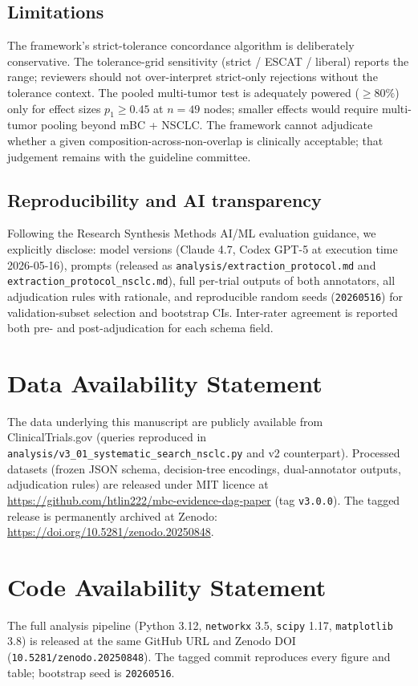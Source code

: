 \documentclass[11pt,a4paper]{article}
\begin{document}
\subsection{Limitations}
The framework's strict-tolerance concordance algorithm is deliberately conservative. The tolerance-grid sensitivity (strict / ESCAT / liberal) reports the range; reviewers should not over-interpret strict-only rejections without the tolerance context. The pooled multi-tumor test is adequately powered ($\ge 80\%$) only for effect sizes $p_1 \ge 0.45$ at $n = 49$ nodes; smaller effects would require multi-tumor pooling beyond mBC + NSCLC. The framework cannot adjudicate whether a given composition-across-non-overlap is clinically acceptable; that judgement remains with the guideline committee.

\subsection{Reproducibility and AI transparency}
Following the Research Synthesis Methods AI/ML evaluation guidance, we explicitly disclose: model versions (Claude 4.7, Codex GPT-5 at execution time 2026-05-16), prompts (released as \texttt{analysis/extraction\_protocol.md} and \texttt{extraction\_protocol\_nsclc.md}), full per-trial outputs of both annotators, all adjudication rules with rationale, and reproducible random seeds (\texttt{20260516}) for validation-subset selection and bootstrap CIs. Inter-rater agreement is reported both pre- and post-adjudication for each schema field.

\section*{Data Availability Statement}
The data underlying this manuscript are publicly available from ClinicalTrials.gov (queries reproduced in \texttt{analysis/v3\_01\_systematic\_search\_nsclc.py} and v2 counterpart). Processed datasets (frozen JSON schema, decision-tree encodings, dual-annotator outputs, adjudication rules) are released under MIT licence at \url{https://github.com/htlin222/mbc-evidence-dag-paper} (tag \texttt{v3.0.0}). The tagged release is permanently archived at Zenodo: \url{https://doi.org/10.5281/zenodo.20250848}.

\section*{Code Availability Statement}
The full analysis pipeline (Python 3.12, \texttt{networkx} 3.5, \texttt{scipy} 1.17, \texttt{matplotlib} 3.8) is released at the same GitHub URL and Zenodo DOI (\texttt{10.5281/zenodo.20250848}). The tagged commit reproduces every figure and table; bootstrap seed is \texttt{20260516}.
\end{document}
